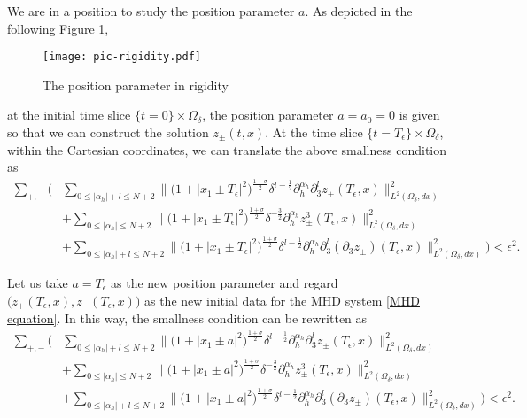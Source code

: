 \documentclass[10pt,reqno]{amsart}
\numberwithin{equation}{section}
\begin{document}
	We are in a position to study the position parameter $a$. As depicted in the following  Figure \ref{fig:rigidity},
	\begin{figure}[ht]
			\vspace{-0.1cm}
		\centering
		\texttt{[image: pic-rigidity.pdf]}
		\vspace{-0.1cm}
		\caption{The position parameter in rigidity}
		\label{fig:rigidity}
			\vspace{-0.1cm}
	\end{figure}
	 at the initial time slice $\{t=0\}\times\Omega_{\delta}$, the position parameter $a=a_0=0$ is given so that we can construct the solution $z_\pm(t,x)$. At the time slice $\{t=T_\epsilon\}\times\Omega_{\delta}$, within the Cartesian coordinates, we can translate the above smallness condition as
	\begin{align*}
	\sum_{+,-}\bigg(&\sum_{0\leqslant|\alpha_h|+l\leqslant N+2}\Big\|\big(1+|x_1\pm T_\epsilon|^2\big)^{\frac{1+\sigma}{2}}\delta^{l-\frac{1}{2}}\partial_h^{\alpha_h}\partial_3^lz_{\pm}(T_\epsilon,x)\Big\|_{L^2(\Omega_{\delta},dx)}^2\\
	&+\sum_{0\leqslant|\alpha_h|\leqslant N+2}\Big\|\big(1+|x_1\pm T_\epsilon|^2\big)^{\frac{1+\sigma}{2}}\delta^{-\frac{3}{2}}\partial_h^{\alpha_h}z^3_{\pm}(T_\epsilon,x)\Big\|_{L^2(\Omega_{\delta},dx)}^2\\
	&+\sum_{0\leqslant|\alpha_h|+l\leqslant N+2}\Big\|\big(1+|x_1\pm T_\epsilon|^2\big)^{\frac{1+\sigma}{2}}\delta^{l-\frac{1}{2}}\partial_h^{\alpha_h}\partial_3^l(\partial_3z_{\pm})(T_\epsilon,x)\Big\|_{L^2(\Omega_{\delta},dx)}^2\bigg)<\epsilon^2.
	\end{align*}

 

Let us take $a=T_\epsilon$ as the new position parameter and regard $\big(z_{+}(T_\epsilon,x),z_{-}(T_\epsilon,x)\big)$ as the new initial data for the MHD system \eqref{MHD equation}. In this way, the smallness condition can be rewritten as 
		\begin{align*}
		\sum_{+,-}\bigg(&\sum_{0\leqslant|\alpha_h|+l\leqslant N+2}\Big\|\big(1+|x_1\pm a|^2\big)^{\frac{1+\sigma}{2}}\delta^{l-\frac{1}{2}}\partial_h^{\alpha_h}\partial_3^lz_{\pm}(T_\epsilon,x)\Big\|_{L^2(\Omega_{\delta},dx)}^2\\
		&+\sum_{0\leqslant|\alpha_h|\leqslant N+2}\Big\|\big(1+|x_1\pm a|^2\big)^{\frac{1+\sigma}{2}}\delta^{-\frac{3}{2}}\partial_h^{\alpha_h}z^3_{\pm}(T_\epsilon,x)\Big\|_{L^2(\Omega_{\delta},dx)}^2\\
		&+\sum_{0\leqslant|\alpha_h|+l\leqslant N+2}\Big\|\big(1+|x_1\pm a|^2\big)^{\frac{1+\sigma}{2}}\delta^{l-\frac{1}{2}}\partial_h^{\alpha_h}\partial_3^l(\partial_3z_{\pm})(T_\epsilon,x)\Big\|_{L^2(\Omega_{\delta},dx)}^2\bigg)<\epsilon^2.
	\end{align*}
\end{document}
